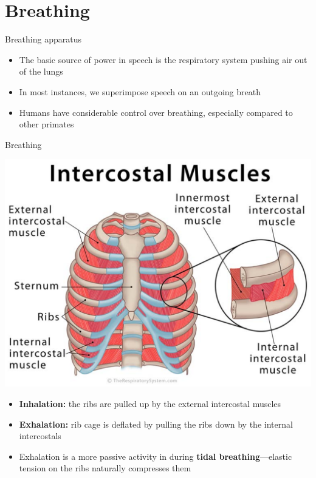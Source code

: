 \documentclass[professionalfonts]{beamer}
\begin{document}
\section*{Breathing}

\begin{frame}{Breathing apparatus}
    \begin{itemize}
        \item The basic source of power in speech is the respiratory system pushing air out of the lungs
        \item In most instances, we superimpose speech on an outgoing breath
        \item Humans have considerable control over breathing, especially compared to other primates
    \end{itemize}
\end{frame}

\begin{frame}{Breathing}
    \begin{multicols}{2}
        \includegraphics[width = \linewidth]{figs/IntercostalMuscles.png}
        \columnbreak
        \begin{itemize}
            \item \textbf{Inhalation:} the ribs are pulled up by the external intercostal muscles
            \item \textbf{Exhalation:} rib cage is deflated by pulling the ribs down by the internal intercostals
            \item Exhalation is a more passive activity in during \textbf{tidal breathing}—elastic tension on the ribs naturally compresses them
        \end{itemize}
    \end{multicols}
\end{frame}
\end{document}
